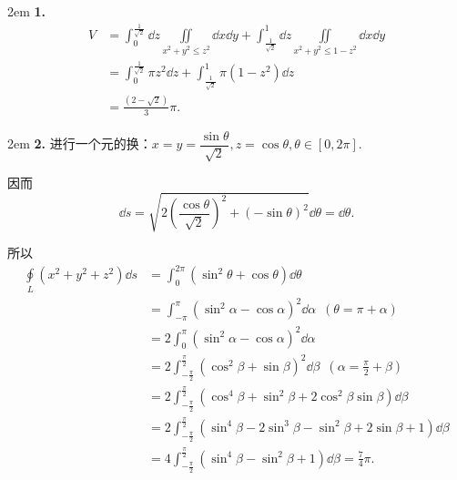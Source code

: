 \documentclass[UTF8,14pt,normal]{ctexart}
\begin{document}
    \hangindent 2em
    \noindent
    \textbf{1.}
    \begin{equation*}
        \begin{split}
            V &= \int_{0}^{\frac{1}{\sqrt{2}}}\dd{z}\iint\limits_{x^2+y^2\leqslant z^2}\dd{x}\dd{y}+\int_{\frac{1}{\sqrt{2}}}^{1}\dd{z}\iint\limits_{x^2+y^2\leqslant 1-z^2}\dd{x}\dd{y}\\
            &= \int_{0}^{\frac{1}{\sqrt{2}}}\pi z^2\dd{z}+\int_{\frac{1}{\sqrt{2}}}^{1}\pi (1-z^2)\dd{z}\\
            &= \frac{(2-\sqrt{2})}{3}\pi.
        \end{split}
    \end{equation*}

    \hangindent 2em
    \noindent
    \textbf{2.}
    进行一个元的换：\(x=y=\dfrac{\sin\theta}{\sqrt{2}},z = \cos\theta,\theta\in[0,2\pi]\).

    因而\[\dd{s} = \sqrt{2\left(\dfrac{\cos\theta}{\sqrt{2}}\right)^2+(-\sin \theta)^2}\dd{\theta} = \dd{\theta}.\]

    所以
    \begin{equation*}
        \begin{split}
            \oint\limits_{L}(x^2+y^2+z^2)\dd{s} &= \int_{0}^{2\pi}(\sin^2\theta+\cos\theta)\dd{\theta}\\
            &= \int_{-\pi}^{\pi}(\sin^2\alpha-\cos\alpha)^2\dd{\alpha}\enspace(\theta = \pi+\alpha)\\
            &= 2\int_{0}^{\pi}(\sin^2\alpha-\cos\alpha)^2\dd{\alpha}\\
            &= 2\int_{-\frac{\pi}{2}}^{\frac{\pi}{2}}(\cos^2\beta+\sin\beta)^2\dd{\beta}\enspace(\alpha = \frac{\pi}{2}+\beta)\\
            &= 2\int_{-\frac{\pi}{2}}^{\frac{\pi}{2}}(\cos^4\beta+\sin^2\beta+2\cos^2\beta\sin\beta)\dd{\beta}\\
            &= 2\int_{-\frac{\pi}{2}}^{\frac{\pi}{2}}(\sin^4\beta-2\sin^3\beta-\sin^2\beta+2\sin\beta+1)\dd{\beta}\\
            &= 4\int_{-\frac{\pi}{2}}^{\frac{\pi}{2}}(\sin^4\beta-\sin^2\beta+1)\dd{\beta} = \frac{7}{4}\pi.
        \end{split}
    \end{equation*}
\end{document}
